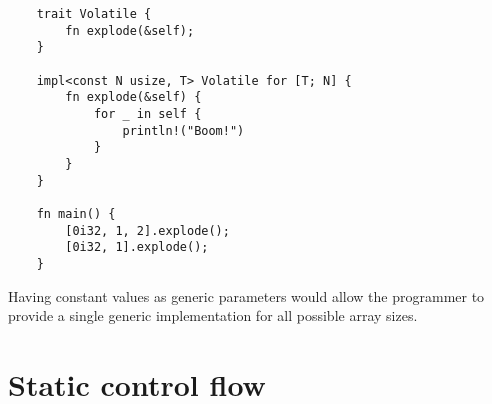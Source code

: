 \begin{listing}
	\begin{verbatim} 
    trait Volatile {
        fn explode(&self);
    }

    impl<const N usize, T> Volatile for [T; N] {
        fn explode(&self) {
            for _ in self {
                println!("Boom!")
            }
        }
    }

    fn main() {
        [0i32, 1, 2].explode(); 
        [0i32, 1].explode();
    }
	\end{verbatim}
    \caption{Having constant values as generic parameters would allow the programmer to provide a single generic implementation for all possible array sizes.}
  \label{lst:const_trait_array}
\end{listing}

\section{Static control flow}
